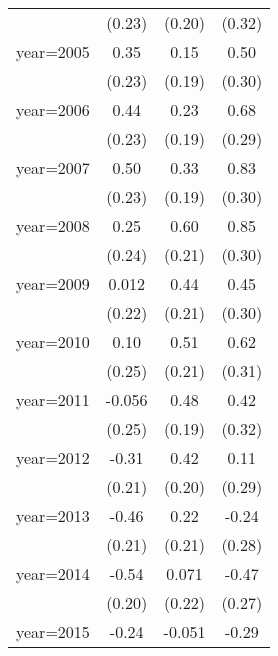 \begin{sidewaystable}[htbp]
\begin{tabular}{l*{3}{c}}
                &   (0.23)         &   (0.20)         &   (0.32)         \\
\addlinespace
year=2005       &     0.35         &     0.15         &     0.50\sym{*}  \\
                &   (0.23)         &   (0.19)         &   (0.30)         \\
\addlinespace
year=2006       &     0.44\sym{*}  &     0.23         &     0.68\sym{**} \\
                &   (0.23)         &   (0.19)         &   (0.29)         \\
\addlinespace
year=2007       &     0.50\sym{**} &     0.33\sym{*}  &     0.83\sym{***}\\
                &   (0.23)         &   (0.19)         &   (0.30)         \\
\addlinespace
year=2008       &     0.25         &     0.60\sym{***}&     0.85\sym{***}\\
                &   (0.24)         &   (0.21)         &   (0.30)         \\
\addlinespace
year=2009       &    0.012         &     0.44\sym{**} &     0.45         \\
                &   (0.22)         &   (0.21)         &   (0.30)         \\
\addlinespace
year=2010       &     0.10         &     0.51\sym{**} &     0.62\sym{*}  \\
                &   (0.25)         &   (0.21)         &   (0.31)         \\
\addlinespace
year=2011       &   -0.056         &     0.48\sym{**} &     0.42         \\
                &   (0.25)         &   (0.19)         &   (0.32)         \\
\addlinespace
year=2012       &    -0.31         &     0.42\sym{**} &     0.11         \\
                &   (0.21)         &   (0.20)         &   (0.29)         \\
\addlinespace
year=2013       &    -0.46\sym{**} &     0.22         &    -0.24         \\
                &   (0.21)         &   (0.21)         &   (0.28)         \\
\addlinespace
year=2014       &    -0.54\sym{***}&    0.071         &    -0.47\sym{*}  \\
                &   (0.20)         &   (0.22)         &   (0.27)         \\
\addlinespace
year=2015       &    -0.24         &   -0.051         &    -0.29         \\

\end{tabular}
\end{sidewaystable}
